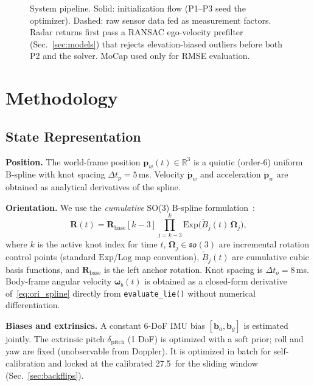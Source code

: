 \documentclass[journal]{IEEEtran}
\newcommand{\vR}{\mathbf{R}}
\newcommand{\vp}{\mathbf{p}}
\newcommand{\vom}{\boldsymbol{\omega}}
\newcommand{\vb}{\mathbf{b}}
\newcommand{\vOm}{\boldsymbol{\Omega}}
\newcommand{\so}{\mathfrak{so}(3)}
\newcommand{\Exp}{\mathrm{Exp}}
\newcommand{\Log}{\mathrm{Log}}
\begin{document}
\begin{figure}[t]
{%
}%
\caption{System pipeline. Solid: initialization flow (P1--P3 seed
the optimizer). Dashed: raw sensor data fed as measurement factors.
Radar returns first pass a RANSAC ego-velocity prefilter
(Sec.~\ref{sec:models}) that rejects elevation-biased outliers before
both P2 and the solver. MoCap used only for RMSE evaluation.}
\label{fig:pipeline}
\end{figure}

\section{Methodology}
\label{sec:method}

\subsection{State Representation}
\label{sec:state}

\textbf{Position.}
The world-frame position $\vp_w(t) \in \mathbb{R}^3$ is a quintic
(order-6) uniform B-spline with knot spacing $\Delta t_p = 5$\,ms.
Velocity $\dot{\vp}_w$ and acceleration $\ddot{\vp}_w$ are
obtained as analytical derivatives of the spline.

\textbf{Orientation.}
We use the \emph{cumulative} SO(3) B-spline
formulation~\cite{sommer2020efficient}:
\begin{equation}
  \vR(t) = \vR_{\mathrm{base}}[k{-}3]
           \prod_{j=k-3}^{k} \Exp\!\bigl(\tilde{B}_j(t)\,\vOm_j\bigr),
  \label{eq:ori_spline}
\end{equation}
where $k$ is the active knot index for time $t$,
$\vOm_j \in \so$ are incremental rotation control points
(standard $\Exp$/$\Log$ map convention),
$\tilde{B}_j(t)$ are cumulative cubic basis functions, and
$\vR_{\mathrm{base}}$ is the left anchor rotation.  Knot spacing
is $\Delta t_o = 8$\,ms.  Body-frame angular velocity $\vom_b(t)$
is obtained as a closed-form derivative of~\eqref{eq:ori_spline}
directly from \texttt{evaluate\_lie()} without numerical
differentiation.

\textbf{Biases and extrinsics.}
A constant 6-DoF IMU bias $[\vb_a, \vb_g]$ is estimated jointly.
The extrinsic pitch $\delta_\text{pitch}$ (1 DoF) is optimized
with a soft prior; roll and yaw are fixed (unobservable from
Doppler).  It is optimized in batch for self-calibration and locked at
the calibrated 27.5\degree\ for the sliding window
(Sec.~\ref{sec:backflips}).
\end{document}

